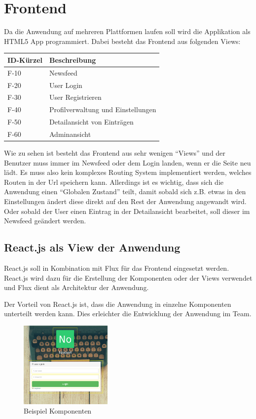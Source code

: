 \chapter{Frontend}

Da die Anwendung auf mehreren Plattformen laufen soll wird die Applikation als HTML5 App programmiert.
Dabei besteht das Frontend aus folgenden Views:
\begin{tabularx}{\textwidth}{|l|X|}
    \toprule
    \textbf{ID-Kürzel} & \textbf{Beschreibung} \\
    \midrule
    \endhead
    \hline
    \caption{Einsatzbereiche}
    \label{Einsatzbereiche:tabelle}
    \endfoot
    F-10 & Newsfeed\\
    F-20 & User Login \\
    F-30 & User Registrieren \\
    F-40 & Profilverwaltung und Einstellungen\\
    F-50 & Detailansicht von Einträgen\\
    F-60 & Adminansicht\\
\end{tabularx}

Wie zu sehen ist besteht das Frontend aus sehr wenigen \enquote{Views} und der Benutzer muss immer im Newsfeed oder dem Login landen, wenn er die Seite neu lädt. 
Es muss also kein komplexes Routing System implementiert werden, welches Routen in der Url speichern kann.
Allerdings ist es wichtig, dass sich die Anwendung einen \enquote{Globalen Zustand} teilt,
damit sobald sich z.B. etwas in den Einstellungen ändert diese direkt auf den Rest der Anwendung angewandt wird.
Oder sobald der User einen Eintrag in der Detailansicht bearbeitet, soll dieser im Newsfeed geändert werden.

\section{React.js als View der Anwendung}
React.js soll in Kombination mit Flux für das Frontend eingesetzt werden.
React.js wird dazu für die Erstellung der Komponenten oder der Views verwendet und Flux dient als Architektur der Anwendung.

Der Vorteil von React.js ist, dass die Anwendung in einzelne Komponenten unterteilt werden kann.
Dies erleichter die Entwicklung der Anwendung im Team.
\begin{figure}[H]\label{frontend:react-components}
    \centering
    \includegraphics[width=0.4\textwidth]{images/react-components.png}
    \caption{Beispiel Komponenten}
\end{figure}

